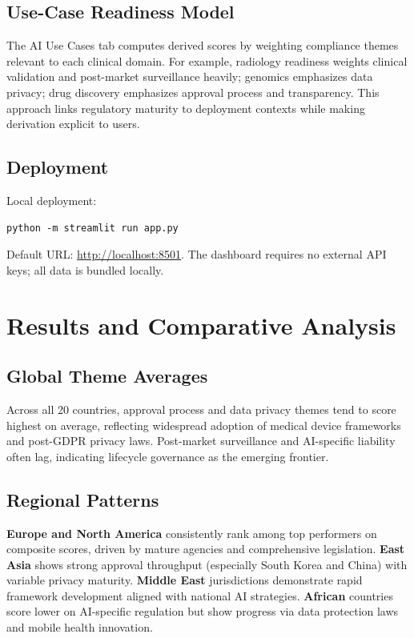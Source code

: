 \documentclass[12pt,a4paper]{report}
\begin{document}
\section{Use-Case Readiness Model}

The AI Use Cases tab computes derived scores by weighting compliance themes relevant to each clinical domain. For example, radiology readiness weights clinical validation and post-market surveillance heavily; genomics emphasizes data privacy; drug discovery emphasizes approval process and transparency. This approach links regulatory maturity to deployment contexts while making derivation explicit to users.

\section{Deployment}

Local deployment:
\begin{lstlisting}
python -m streamlit run app.py
\end{lstlisting}
Default URL: \url{http://localhost:8501}. The dashboard requires no external API keys; all data is bundled locally.

\chapter{Results and Comparative Analysis}
\label{ch:results}

\section{Global Theme Averages}

Across all 20 countries, approval process and data privacy themes tend to score highest on average, reflecting widespread adoption of medical device frameworks and post-GDPR privacy laws. Post-market surveillance and AI-specific liability often lag, indicating lifecycle governance as the emerging frontier.

\section{Regional Patterns}

\textbf{Europe and North America} consistently rank among top performers on composite scores, driven by mature agencies and comprehensive legislation. \textbf{East Asia} shows strong approval throughput (especially South Korea and China) with variable privacy maturity. \textbf{Middle East} jurisdictions demonstrate rapid framework development aligned with national AI strategies. \textbf{African} countries score lower on AI-specific regulation but show progress via data protection laws and mobile health innovation.
\end{document}
